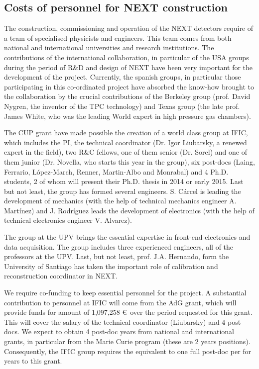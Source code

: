 \subsection{Costs of personnel for NEXT construction}

The construction, commissioning and operation of the NEXT detectors require of a team of specialised physicists and engineers. This team comes from both national and international universities and research institutions. The contributions of the international collaboration, in particular of the USA groups during the period of R\&D and design of NEXT have been very important for the development of the project. Currently, the spanish groups, in particular those participating in this co-ordinated project have absorbed the know-how brought to the collaboration by the crucial contributions of the Berkeley group (prof. David Nygren, the inventor of the TPC technology) and Texas group (the late prof. James White, who was the leading World expert in high pressure gas chambers). 

The CUP grant have made possible the creation of a world class group at IFIC, which includes the PI, the technical coordinator (Dr. Igor Liubarsky, a renewed expert in the field), two R\&C fellows, one of them senior (Dr. Sorel) and one of them junior (Dr. Novella, who starts this year in the group), six post-docs  (Laing, Ferrario, L\'opez-March,  Renner, Martin-Albo and Monrabal) and 4 Ph.D. students, 2 of whom will present their Ph.D. thesis in 2014 or early 2015. Last but not least, the group has formed several engineers. S. C\'arcel is leading the development of mechanics (with the help of technical mechanics engineer A. Mart\'inez) and J. Rodr\'iguez leads the development of electronics (with the help of technical electronics engineer V. Alvarez).

The group at the UPV brings the essential expertise in front-end electronics and data acquisition. The group includes three experienced engineers, all of the professors at the UPV. Last, but not least, prof. J.A. Hernando, form the University of Santiago has taken the important role of calibration and reconstruction coordinator in NEXT. 

We require co-funding to keep essential personnel for the project. A substantial contribution to personnel at IFIC will come from the  AdG grant, which will provide funds for amount of 1,097,258 \euro\ over the period requested for this grant. This will cover the salary of the technical coordinator (Liubarsky) and 4 post-docs. We expect to obtain 4 post-doc years from national and international grants, in particular from the Marie Curie program (these are 2 years positions). Consequently, the IFIC group requires the equivalent to one full post-doc per for years to this grant.  

